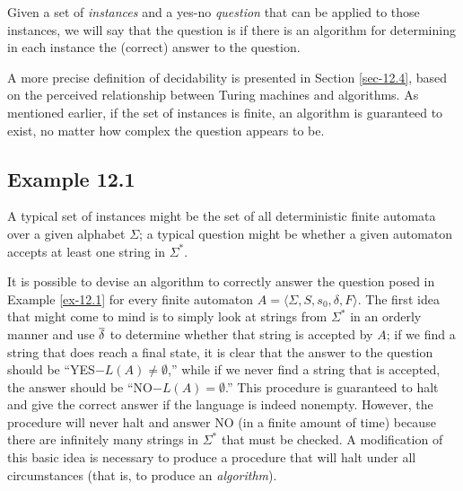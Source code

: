 \begin{dfn}\label{dfn-12.1}
Given a set of \emph{instances} and a yes-no \emph{question} that can be
applied to those instances, we will say that the question is
\emph{} if there is an algorithm for determining in each
instance the (correct) answer to the question.
\end{dfn}

A more precise definition of decidability is presented in Section \ref{sec-12.4}, based
on the perceived relationship between Turing machines and algorithms. As
mentioned earlier, if the set of instances is finite, an algorithm is guaranteed
to exist, no matter how complex the question appears to be.

\subsection*{Example 12.1}\label{ex-12.1}

A typical set of instances might be the set of all deterministic finite
automata over a given alphabet $\Sigma$; a typical question might be whether a
given automaton accepts at least one string in $\Sigma^*$.

It is possible to devise an algorithm to correctly answer the question posed
in Example \ref{ex-12.1} for every finite automaton $A=\langle\Sigma,S,s_0,\delta,F\rangle$.
The first idea that might come to mind is to simply look at strings from
$\Sigma^*$ in an orderly manner and use $\overline{\delta}$ to determine whether that string
is accepted by $A$; if we find a string that does reach a final state, it is
clear that the answer to the question should be ``YES$-L(A)\not=\emptyset$,''
while if we never find a string that is accepted, the answer should be ``NO$-
L(A)=\emptyset$.'' This procedure is guaranteed to halt and give the correct
answer if the language is indeed nonempty. However, the procedure will never
halt and answer NO (in a finite amount of time) because there are infinitely
many strings in $\Sigma^*$ that must be checked. A modification of this
basic idea is necessary to produce a procedure that will halt under all
circumstances (that is, to produce an \emph{algorithm}).

